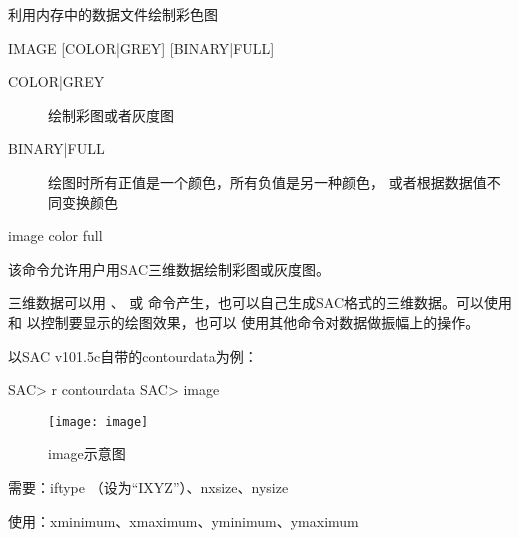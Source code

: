 \label{cmd:image}

利用内存中的数据文件绘制彩色图

\begin{SACSTX}
IMAGE [COLOR|GREY] [BINARY|FULL]
\end{SACSTX}

\begin{description}
\item [COLOR|GREY] 绘制彩图或者灰度图
\item [BINARY|FULL] 绘图时所有正值是一个颜色，所有负值是另一种颜色，
    或者根据数据值不同变换颜色
\end{description}

\begin{SACDFT}
image color full
\end{SACDFT}

该命令允许用户用SAC三维数据绘制彩图或灰度图。

三维数据可以用 、 或
 命令产生，也可以自己生成SAC格式的三维数据。可以使用
 和  以控制要显示的绘图效果，也可以
使用其他命令对数据做振幅上的操作。

以SAC v101.5c自带的contourdata为例：
\begin{SACCode}
SAC> r contourdata
SAC> image
\end{SACCode}

\begin{figure}[!ht]
\centering
\texttt{[image: image]}
\caption{image示意图}
\end{figure}

需要：iftype （设为``IXYZ''）、nxsize、nysize

使用：xminimum、xmaximum、yminimum、ymaximum
